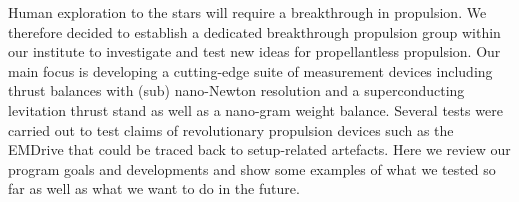 \documentclass[a4paper,parskip,10pt]{scrartcl}
\begin{document}
    \begin{tcolorbox}[
        enhanced,
        title={Keynote Lecture 2: Martin Tajmar (TU Dresden) \\  Overview of Breakthrough Propulsion at TU Dresden},
        sharp corners,
        colbacktitle=thistrack,
        fonttitle=\large\mediumfont,
        boxsep=0pt,
        boxrule=0pt,
        left*=0pt,
        lefttitle=4mm,
        toptitle=4mm,
        bottomtitle=4mm,
        top=0pt,
        bottom=0pt,
        sidebyside,
        sidebyside align=center,
        lefthand width=6cm,
        segmentation empty,
    ]%
        
        \tcblower

        \setlength{\parskip}{1ex}
        
        \vspace{1ex}
        Human exploration to the stars will require a breakthrough in propulsion. We therefore decided to establish a dedicated breakthrough propulsion group within our institute to investigate and test new ideas for propellantless propulsion. Our main focus is developing a cutting-edge suite of measurement devices including thrust balances with (sub) nano-Newton resolution and a superconducting levitation thrust stand as well as a nano-gram weight balance. Several tests were carried out to test claims of revolutionary propulsion devices such as the EMDrive that could be traced back to setup-related artefacts. Here we review our program goals and developments and show some examples of what we tested so far as well as what we want to do in the future.


\end{tcolorbox}
\end{document}
